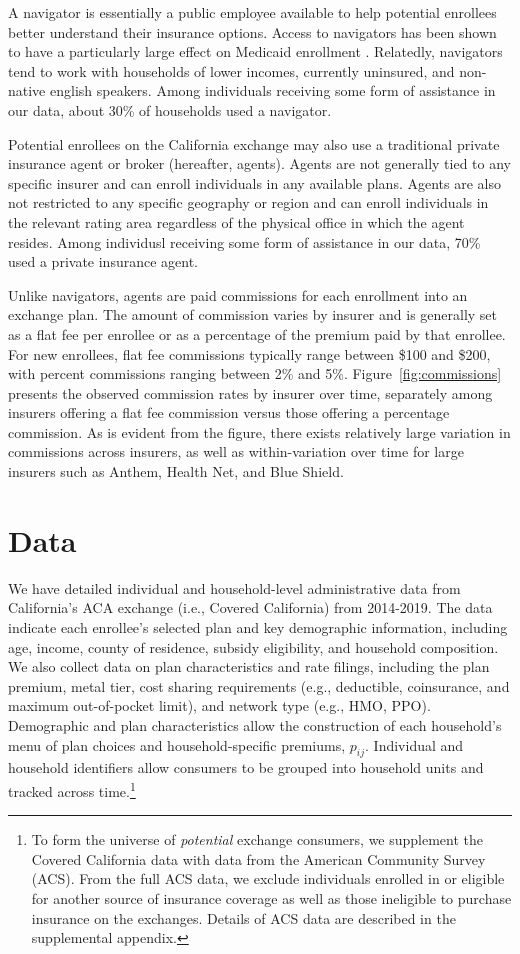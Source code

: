 \documentclass[12pt]{article}
\begin{document}
A navigator is essentially a public employee available to help potential enrollees better understand their insurance options. Access to navigators has been shown to have a particularly large effect on Medicaid enrollment \citep{myerson2019, sommers2015, aizer2003}. Relatedly, navigators tend to work with households of lower incomes, currently uninsured, and non-native english speakers. Among individuals receiving some form of assistance in our data, about 30\% of households used a navigator.

Potential enrollees on the California exchange may also use a traditional private insurance agent or broker (hereafter, agents). Agents are not generally tied to any specific insurer and can enroll individuals in any available plans. Agents are also not restricted to any specific geography or region and can enroll individuals in the relevant rating area regardless of the physical office in which the agent resides. Among individusl receiving some form of assistance in our data, 70\% used a private insurance agent.

Unlike navigators, agents are paid commissions for each enrollment into an exchange plan. The amount of commission varies by insurer and is generally set as a flat fee per enrollee or as a percentage of the premium paid by that enrollee. For new enrollees, flat fee commissions typically range between \$100 and \$200, with percent commissions ranging between 2\% and 5\%. Figure~\ref{fig:commissions} presents the observed commission rates by insurer over time, separately among insurers offering a flat fee commission versus those offering a percentage commission. As is evident from the figure, there exists relatively large variation in commissions across insurers, as well as within-variation over time for large insurers such as Anthem, Health Net, and Blue Shield.


\section{Data}
\label{sec:data}
We have detailed individual and household-level administrative data from California's ACA exchange (i.e., Covered California) from 2014-2019. The data indicate each enrollee's selected plan and key demographic information, including age, income, county of residence, subsidy eligibility, and household composition. We also collect data on plan characteristics and rate filings, including the plan premium, metal tier, cost sharing requirements (e.g., deductible, coinsurance, and maximum out-of-pocket limit), and network type (e.g., HMO, PPO). Demographic and plan characteristics allow the construction of each household's menu of plan choices and household-specific premiums, $p_{ij}$. Individual and household identifiers allow consumers to be grouped into household units and tracked across time.\footnote{To form the universe of \textit{potential} exchange consumers, we supplement the Covered California data with data from the American Community Survey (ACS). From the full ACS data, we exclude individuals enrolled in or eligible for another source of insurance coverage as well as those ineligible to purchase insurance on the exchanges. Details of ACS data are described in the supplemental appendix.} 
\end{document}
